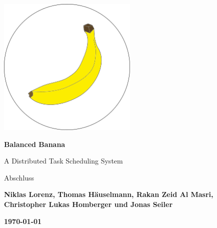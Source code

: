 \begin{titlepage}
    \begin{center}
    
     \vspace*{0.8cm}
 
        \includegraphics[width=0.5\textwidth]{balancedbanana.png}
        \vspace*{1cm}
 
        \Huge
        \textbf{Balanced Banana}
 
        \vspace{0.5cm}
        \LARGE
        A Distributed Task Scheduling System
        
        \vspace{0.5 cm}
        \LARGE
        Abschluss
 
        \vspace{1.5cm}

        \large
        \textbf{Niklas Lorenz, Thomas Häuselmann, Rakan Zeid Al Masri, Christopher Lukas Homberger und Jonas Seiler}
 
        \vspace*{0.5cm}

        \textbf{\today}
 
       
        
 
    \end{center}
\end{titlepage}